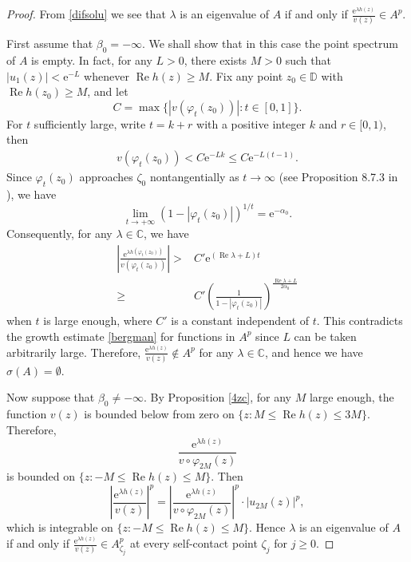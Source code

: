 \documentclass{amsart}
\theoremstyle{proclaim}
\theoremstyle{fancyproclaim}
\theoremstyle{definition}
\theoremstyle{fancystatement}
\numberwithin{equation}{section}
\begin{document}
\begin{proof}

From \eqref{difsolu} we see that $\lambda$ is an eigenvalue of $A$ if and only if $\frac{ \mathrm{e}^{\lambda h(z)}}{v(z)}\in A^p$.

First assume that $\beta_0=-\infty$. We shall show that in this case the point spectrum of $A$ is empty. In fact, for any $L>0$, there exists $M>0$ such that $|u_1(z)|<\mathrm{e}^{-L}$ whenever $\operatorname{Re}h(z)\geq M$. Fix any point $z_0\in\mathbb{D}$ with $\operatorname{Re}h(z_0)\geq M$, and let 
$$C=\max\{|v(\varphi_t(z_0))| : t\in[0,1]\}.$$ 
For $t$ sufficiently large, write $t=k+r$ with a positive integer $k$ and $r\in[0,1)$, then
\begin{align}\label{daibu}
v(\varphi_t(z_0))< C\mathrm{e}^{-Lk}\leq C\mathrm{e}^{-L(t-1)}.
\end{align}
Since $\varphi_t(z_0)$ approaches $\zeta_0$ nontangentially as $t\to\infty$ (see Proposition 8.7.3 in \cite{cs}), we have
$$\lim_{t\to+\infty}(1-|\varphi_t(z_0)|)^{1/t}=\mathrm{e}^{-\alpha_0}.$$ 
Consequently, for any $\lambda\in\mathbb{C}$, we have 
\begin{align*}
\left|\frac{ \mathrm{e}^{\lambda h(\varphi_t(z_0))}}{v(\varphi_t(z_0))}\right|>&C' \mathrm{e}^{(\operatorname{Re}\lambda+L)t}\\
\geq&C'\left(\frac{1}{1-|\varphi_t(z_0)|}\right)^{\frac{\operatorname{Re}\lambda+L}{2\alpha_0}}
\end{align*}
when $t$ is large enough, where $C'$ is a constant independent of $t$. This contradicts the growth estimate \eqref{bergman} for functions in $A^p$ since $L$ can be taken arbitrarily large. Therefore, $\frac{ \mathrm{e}^{\lambda h(z)}}{v(z)}\notin A^p$ for any $\lambda\in\mathbb{C}$, and hence we have $\sigma(A)=\emptyset$.

Now suppose that $\beta_0\ne-\infty$. By Proposition \ref{4zc}, for any $M$ large enough, the function $v(z)$ is bounded below from zero on $\{z : M \leq  \operatorname{Re}h(z) \leq3M\}$. Therefore,
$$\frac{ \mathrm{e}^{\lambda h(z)}}{v\circ\varphi_{2M}(z)}$$
is bounded on $\{z : -M \leq \operatorname{Re}h(z)\leq M\}$. Then
$$\left|\frac{\mathrm{e}^{\lambda h(z)}}{v(z)}\right|^p=\left|\frac{ \mathrm{e}^{\lambda h(z)}}{v\circ\varphi_{2M}(z)}\right|^p\cdot|u_{2M}(z)|^p,$$
which is integrable on $\{z : -M \leq\operatorname{Re}h(z) \leq M\}$. Hence $\lambda$ is an eigenvalue of $A$ if and only if $\frac{ \mathrm{e}^{\lambda h(z)}}{v(z)}\in A^p_{\zeta_j}$ at every self-contact point $\zeta_j$ for $j\geq 0$.


\end{proof}
\end{document}
